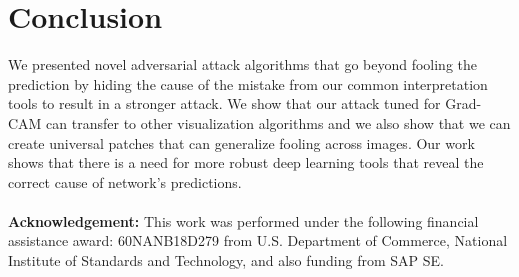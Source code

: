 \documentclass[10pt,twocolumn,letterpaper]{article}
\begin{document}






\section{Conclusion}
We presented novel adversarial attack algorithms that go beyond fooling the prediction by hiding the cause of the mistake from our common interpretation tools to result in a stronger attack. We show that our attack tuned for Grad-CAM can transfer to other visualization algorithms and we also show that we can create universal patches that can generalize fooling across images. Our work shows that there is a need for more robust deep learning tools that reveal the correct cause of network's predictions.\\ \\

{\bf Acknowledgement:} This work was performed under the following financial assistance award: 60NANB18D279 from U.S. Department of Commerce, National Institute of Standards and Technology, and also funding from SAP SE.





\end{document}
